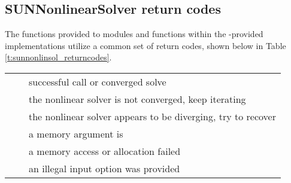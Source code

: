 \subsection{SUNNonlinearSolver return codes}
\label{ss:sunnonlinsol_returncodes}

The functions provided to {\sunnonlinsol} modules and functions within
the {\sundials}-provided {\sunnonlinsol} implementations utilize a
common set of return codes, shown below in Table \ref{t:sunnonlinsol_returncodes}.

\newlength{\ColumnOneA}
\newlength{\ColumnTwoA}
\newlength{\ColumnThreeA}
\setlength{\ColumnThreeA}{\textwidth}
\addtolength{\ColumnThreeA}{-0.5in}
\addtolength{\ColumnThreeA}{-\ColumnOneA}
\addtolength{\ColumnThreeA}{-\ColumnTwoA}

\label{t:sunnonlinsol_returncodes}
\begin{xtabular}{|p{\ColumnOneA}|p{\ColumnTwoA}|p{\ColumnThreeA}|}
     &   & successful call or converged solve
\\[1mm]
    &   & the nonlinear solver is not
                                      converged, keep iterating 
\\[1mm]
 &   & the nonlinear solver appears to
                                       be diverging, try to recover
\\[1mm]
   &  & a memory argument is 
\\[1mm]
   &  & a memory access or allocation failed
\\[1mm]
  &  & an illegal input option was provided
\\
\end{xtabular}
\bigskip


